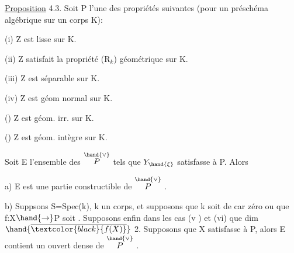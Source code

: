 
\uline{Proposition} 4.3.    Soit P l'une des propriétés  suivantes (pour un
préschéma algébrique sur un corps K):

(i)  Z  est lisse sur K.

(ii)  Z satisfait la propriété (R$_k$) géométrique sur K.

(iii)  Z est séparable sur K.

(iv)  Z est géom normal sur K.

()  Z  est géom. irr.  sur K.

()  Z est géom. intègre  sur K.

Soit E l'ensemble des \hand{$\xi \in$} $\overset{\hand{\vee}}{P}$  tels que $Y_{\hand{\xi}}$ satisfasse à P. Alors

a)  E est une partie constructible de $\overset{\hand{\vee}}{P}$ .

b)  Suppsons  S=Spec(k), k un corps, et supposons  que k soit de
car zéro  ou que f:X$\hand{\rightarrow}$P  soit . Supposons enfin dans les
cas (v ) et (vi)  que dim $\hand{\overline{\textcolor{black}{f(X)}}}$  2.  Supposons que X satisfasse à P,
alors E contient un ouvert  dense de $\overset{\hand{\vee}}{P}$ .


